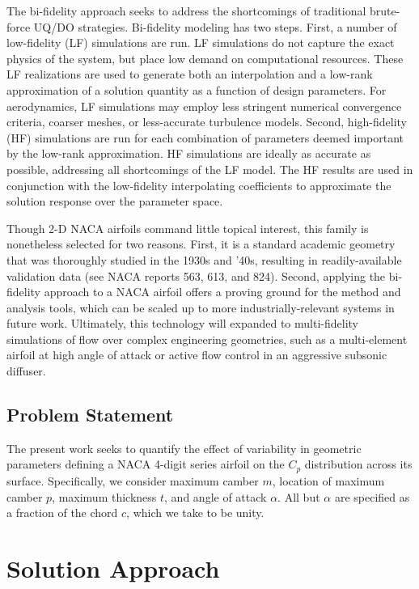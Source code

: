 \documentclass[11pt]{article}
\begin{document}
The bi-fidelity approach seeks to address the shortcomings of traditional brute-force UQ/DO strategies. Bi-fidelity modeling has two steps. First, a number of low-fidelity (LF) simulations are run. LF simulations do not capture the exact physics of the system, but place low demand on computational resources. These LF realizations are used to generate both an interpolation and a low-rank approximation of a solution quantity as a function of design parameters. For aerodynamics, LF simulations may employ less stringent numerical convergence criteria, coarser meshes, or less-accurate turbulence models. Second, high-fidelity (HF) simulations are run for each combination of parameters deemed important by the low-rank approximation. HF simulations are ideally as accurate as possible, addressing all shortcomings of the LF model. The HF results are used in conjunction with the low-fidelity interpolating coefficients to approximate the solution response over the parameter space.

Though 2-D NACA airfoils command little topical interest, this family is nonetheless selected for two reasons. First, it is a standard academic geometry that was thoroughly studied in the 1930s and '40s, resulting in readily-available validation data (see NACA reports 563, 613, and 824). Second, applying the bi-fidelity approach to a NACA airfoil offers a proving ground for the method and analysis tools, which can be scaled up to more industrially-relevant systems in future work. Ultimately, this technology will expanded to multi-fidelity simulations of flow over complex engineering geometries, such as a multi-element airfoil at high angle of attack or active flow control in an aggressive subsonic diffuser.

\subsection{Problem Statement}

The present work seeks to quantify the effect of variability in geometric parameters defining a NACA 4-digit series airfoil on the $C_p$ distribution across its surface. Specifically, we consider maximum camber $m$, location of maximum camber $p$, maximum thickness $t$, and angle of attack $\alpha$. All but $\alpha$ are specified as a fraction of the chord $c$, which we take to be unity.

\section{Solution Approach}
\end{document}
